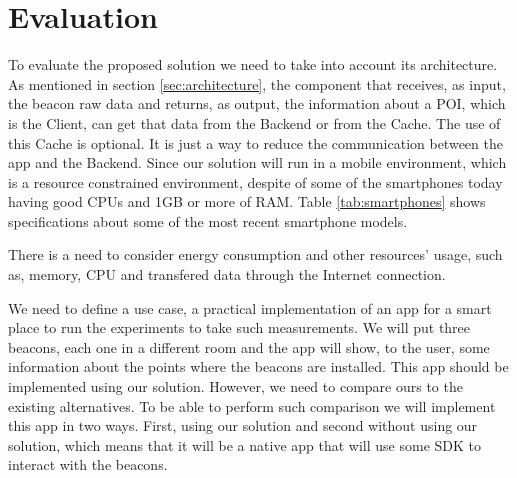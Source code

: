 
% 
% 

\section{Evaluation}
\label{sec:evaluation}


To evaluate the proposed solution we need to take into account its
architecture. As mentioned in section \ref{sec:architecture},
the component that receives, as input, the beacon raw data and
returns, as output, the information about a POI, which is the
Client, can get that data from the Backend or from the Cache.
The use of this Cache is optional. It is just a way to reduce
the communication between the app and the Backend.
Since our solution will run in a mobile environment, 
which is a resource constrained environment,
despite of some of the smartphones today having
good CPUs and 1GB or more of RAM.
Table \ref{tab:smartphones} shows specifications about some 
of the most recent smartphone models.

There is a need to consider energy consumption and other resources'
usage, such as, memory, CPU and transfered data through the
Internet connection.

We need to define a use case, a practical implementation
of an app for a smart place to run the experiments
to take such measurements. We will put three beacons,
each one in a different room and the app will show, to the user,
some information about the points where the beacons
are installed.
This app should be implemented using our solution.
However, we need to compare ours to the existing
alternatives. To be able to perform such comparison
we will implement this app in two ways.
First, using our solution and second without using
our solution, which means that it will be a native
app that will use some SDK to interact with the
beacons.

